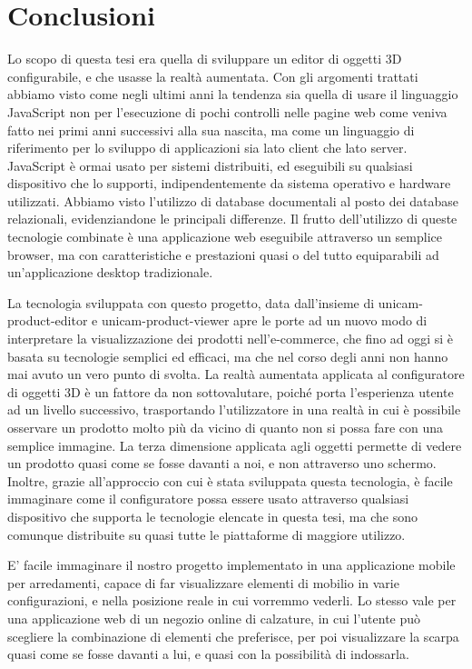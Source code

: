 \chapter{Conclusioni}
\label{chap:conclusioni}
Lo scopo di questa tesi era quella di sviluppare un editor di oggetti 3D configurabile, e che usasse la realtà aumentata.
Con gli argomenti trattati abbiamo visto come negli ultimi anni la tendenza sia quella di usare il linguaggio JavaScript non per l'esecuzione di pochi controlli nelle pagine web come veniva fatto nei primi anni successivi alla sua nascita, ma come un linguaggio di riferimento per lo sviluppo di applicazioni sia lato client che lato server. JavaScript è ormai usato per sistemi distribuiti, ed eseguibili su qualsiasi dispositivo che lo supporti, indipendentemente da sistema operativo e hardware utilizzati.
Abbiamo visto l'utilizzo di database documentali al posto dei database relazionali, evidenziandone le principali differenze.
Il frutto dell'utilizzo di queste tecnologie combinate è una applicazione web eseguibile attraverso un semplice browser, ma con caratteristiche e prestazioni quasi o del tutto equiparabili ad un'applicazione desktop tradizionale.

La tecnologia sviluppata con questo progetto, data dall'insieme di unicam-product-editor e unicam-product-viewer apre le porte ad un nuovo modo di interpretare la visualizzazione dei prodotti nell'e-commerce, che fino ad oggi si è basata su tecnologie semplici ed efficaci, ma che nel corso degli anni non hanno mai avuto un vero punto di svolta. La realtà aumentata applicata al configuratore di oggetti 3D è un fattore da non sottovalutare, poiché porta l'esperienza utente ad un livello successivo, trasportando l'utilizzatore in una realtà in cui è possibile osservare un prodotto molto più da vicino di quanto non si possa fare con una semplice immagine. La terza dimensione applicata agli oggetti permette di vedere un prodotto quasi come se fosse davanti a noi, e non attraverso uno schermo. Inoltre, grazie all'approccio con cui è stata sviluppata questa tecnologia, è facile immaginare come il configuratore possa essere usato attraverso qualsiasi dispositivo che supporta le tecnologie elencate in questa tesi, ma che sono comunque distribuite su quasi tutte le piattaforme di maggiore utilizzo.

E' facile immaginare il nostro progetto implementato in una applicazione mobile per arredamenti, capace di far visualizzare elementi di mobilio in varie configurazioni, e nella posizione reale in cui vorremmo vederli.
Lo stesso vale per una applicazione web di un negozio online di calzature, in cui l'utente può scegliere la combinazione di elementi che preferisce, per poi visualizzare la scarpa quasi come se fosse davanti a lui, e quasi con la possibilità di indossarla.

